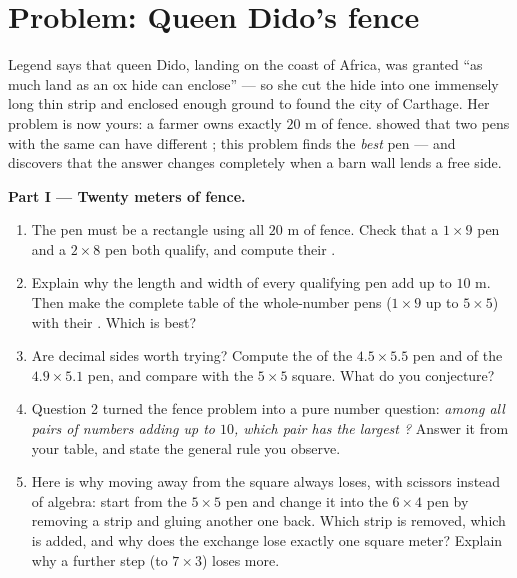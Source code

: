 \section{Problem: Queen Dido's fence}

\begin{problem}
\label{pb:g6:measure:1}
Legend says that queen Dido, landing on the coast of Africa, was
granted ``as much land as an ox hide can enclose'' --- so she cut
the hide into one immensely long thin strip and enclosed enough
ground to found the city of Carthage. Her problem is now yours: a
farmer owns exactly $20$ m of fence. 
showed that two pens with the same  can have different
; this problem finds the \emph{best} pen --- and discovers
that the answer changes completely when a barn wall lends a free
side.

\medskip
\noindent\textbf{Part I --- Twenty meters of fence.}
\begin{enumerate}
  \item The pen must be a rectangle using all $20$ m of fence.
        Check that a $1 \times 9$ pen and a $2 \times 8$ pen both
        qualify, and compute their .
  \item Explain why the length and width of every qualifying pen
        add up to $10$ m. Then make the complete table of the
        whole-number pens ($1 \times 9$ up to $5 \times 5$) with
        their . Which is best?
  \item Are decimal sides worth trying? Compute the  of the
        $4.5 \times 5.5$ pen and of the $4.9 \times 5.1$ pen, and
        compare with the $5 \times 5$ square. What do you
        conjecture?
  \item Question 2 turned the fence problem into a pure number
        question: \emph{among all pairs of numbers adding up to
        $10$, which pair has the largest ?} Answer it from
        your table, and state the general rule you observe.
  \item Here is why moving away from the square always loses,
        with scissors instead of algebra: start from the
        $5 \times 5$ pen and change it into the $6 \times 4$ pen
        by removing a strip and gluing another one back. Which
        strip is removed, which is added, and why does the
        exchange lose exactly one square meter? Explain why a
        further step (to $7 \times 3$) loses  more.
\end{enumerate}


\end{problem}
